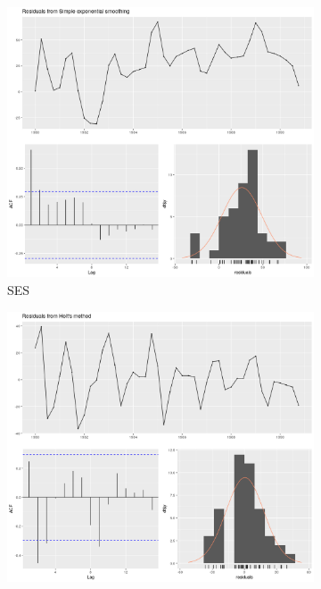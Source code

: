 \documentclass[10pt]{article}
\begin{document}
\begin{figure}
\centering
\begin{subfigure}{.32\textwidth}
  \centering
  \includegraphics[width=\linewidth]{img/check_resid_ses.png}
  \caption{SES}
  \label{fig:ses_resid}
\end{subfigure}
\begin{subfigure}{.32\textwidth}
  \centering
  \includegraphics[width=\linewidth]{img/check_resid_holt.png}

\end{subfigure}
\end{figure}
\end{document}
